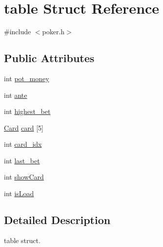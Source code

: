 \hypertarget{structtable}{\section{table Struct Reference}
\label{structtable}
}


{\ttfamily \#include $<$poker.\+h$>$}

\subsection*{Public Attributes}
\begin{DoxyCompactItemize}
\item 
int \hyperlink{structtable_a742ffe5b682ef41e0d5284865d6f9707}{pot\+\_\+money}
\item 
int \hyperlink{structtable_a9bc7be4e5c17f0275b75764d87ac3af7}{ante}
\item 
int \hyperlink{structtable_a50a5836f04eb5607ba290c98aa640767}{highest\+\_\+bet}
\item 
\hyperlink{demo_8c_aacb186b77382a02f7317dc38797f37c2}{Card} \hyperlink{structtable_a4bcf571392db944947042f1faa90ad70}{card} \mbox{[}5\mbox{]}
\item 
int \hyperlink{structtable_ae74466d246cfcd247e0c4e49318edf8a}{card\+\_\+idx}
\item 
int \hyperlink{structtable_a4ca9edd8b9f6515674caaf6df7c621c0}{last\+\_\+bet}
\item 
int \hyperlink{structtable_a1d8bc65b5a26f8b5b7a21a2430432901}{show\+Card}
\item 
int \hyperlink{structtable_ab1dd17260b838f195fd032c19bbd7ba5}{is\+Load}
\end{DoxyCompactItemize}


\subsection{Detailed Description}
table struct. 

